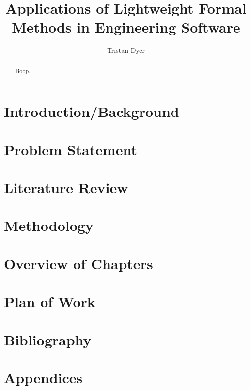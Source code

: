 \documentclass[draft, a4paper]{article}
\begin{document}
\title{Applications of Lightweight Formal Methods in Engineering Software}
\author{Tristan Dyer}
\maketitle

\begin{abstract}
Boop.
\end{abstract}

\section{Introduction/Background}


\section{Problem Statement}


\section{Literature Review}


\section{Methodology}


\section{Overview of Chapters}


\section{Plan of Work}


\section{Bibliography}


\section{Appendices}

\end{document}
